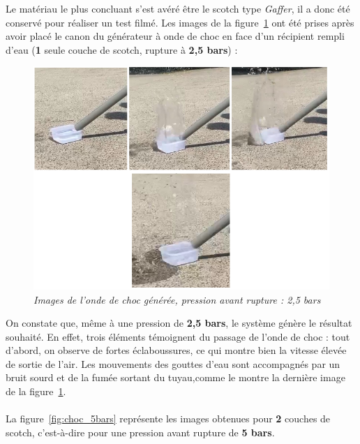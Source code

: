 Le matériau le plus concluant s’est avéré être le scotch type \textit{Gaffer}, il a donc été conservé pour réaliser un test filmé. Les images de la figure~\ref{fig:choc_filmee} ont été prises après avoir placé le canon du générateur à onde de choc en face d’un récipient rempli d’eau (\textbf{1} seule couche de scotch, rupture à \textbf{2,5 bars}) :\\
\begin{figure}[H]
	\centering
	\includegraphics[scale = 0.5]{figures/choc_filmee.png}
	\caption{\small{\textit{Images de l'onde de choc générée, pression avant rupture : 2,5 bars}}}
	\label{fig:choc_filmee}
\end{figure}
On constate que, même à une pression de \textbf{2,5 bars}, le système génère le résultat souhaité. En effet, trois éléments témoignent du passage de l’onde de choc : tout d'abord, on observe de fortes éclaboussures, ce qui montre bien la vitesse élevée de sortie de l'air. Les mouvements des gouttes d'eau sont accompagnés par un bruit sourd et de la fumée sortant du tuyau,comme le montre la dernière image de la figure~\ref{fig:choc_filmee}.\\\\
La figure~\ref{fig:choc_5bars} représente les images obtenues pour \textbf{2} couches de scotch, c'est-à-dire pour une pression avant rupture de \textbf{5 bars}.\\
